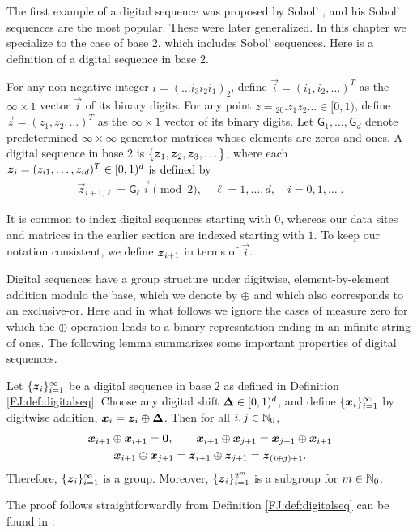 \documentclass[graybox,footinfo]{svmult}
\begin{document}
The first example of a digital sequence was proposed by Sobol' \cite{Sob67}, and his Sobol' sequences are the most popular.  These were later generalized.  In this chapter we specialize to the case of base $2$, which includes Sobol' sequences.  Here is a definition of a digital sequence in base $2$.

\begin{definition} \label{FJ:def:digitalseq}
	For any non-negative integer $i = (\dots i_3 i_2 i_1)_2$, define $\overrightarrow{i} = (i_1, i_2, \dots)^T$ as the $\infty \times 1$ vector $\overrightarrow{i}$ of its binary digits. 
	For any point $z = {}_20.z_1 z_2 \dots \in [0, 1)$, define $\overrightarrow{z} = (z_1, z_2, \dots)^T$ as the $\infty \times 1$ vector of its binary digits. 
	Let $ \mathsf{G}_1, \dots , \mathsf{G}_d$ denote predetermined $\infty \times \infty$ generator matrices whose elements are zeros and ones. 
	A digital sequence in base $2$ is $\{{\boldsymbol{z}}_1, {\boldsymbol{z}}_2, {\boldsymbol{z}}_3, \dots\}$, where each ${\boldsymbol{z}}_i = ( z_{i1}, \dots , z_{id})^T \in [0, 1)^d$ is defined by
	\begin{align*}
	\overrightarrow{z}_{i+1,\ell} = \mathsf{G}_{\ell} \, \overrightarrow{i} \pmod 2,  \quad \ell = 1, \dots, d, \quad i = 0, 1, \dots \;.
	\end{align*}
\end{definition}

It is common to index digital sequences starting with $0$, whereas our data sites and matrices in the earlier section are indexed starting with $1$.  To keep our notation consistent, we define ${\boldsymbol{z}}_{i+1}$ in terms of $\overrightarrow{i}$.

Digital sequences have a group structure under digitwise, element-by-element addition modulo the base, which we denote by $\oplus$ and which also corresponds to an exclusive-or. Here and in what follows we ignore the cases of measure zero for which the $\oplus$ operation leads to a binary represntation ending in an infinite string of ones.  The following lemma summarizes some important properties of digital sequences. 


\begin{lemma}
	\label{FJ:lemma:digital_net_prop}
	Let $\{{\boldsymbol{z}}_i\}_{i=1}^{\infty}$ be a digital sequence in base $2$ as defined in Definition \ref{FJ:def:digitalseq}.  Choose any digital shift ${\boldsymbol{\Delta}} \in [0,1)^d$, and define $\{{\boldsymbol{x}}_i\}_{i=1}^{\infty}$ by digitwise addition, ${\boldsymbol{x}}_{i} = {\boldsymbol{z}}_{i} \oplus {\boldsymbol{\Delta}}$.
	Then for all $i,j \in {\mathbb{N}}_0$,
	\begin{gather}
		\label{FJ:eqn:digital_net_symmetric_prop}
	\bsx_{i+1} \oplus \bsx_{i+1} = \boldsymbol{0}, \qquad 
	\bsx_{i+1} \oplus \bsx_{j+1} = \bsx_{j+1} \oplus \bsx_{i+1} \\
	\label{FJ:eqn:digital_shift_prop}
	\bsx_{i+1} \oplus \bsx_{j+1} = \bsz_{i+1} \oplus \bsz_{j+1} = \bsz_{(i \oplus j) + 1 }.
	\end{gather}
	Therefore, $\{{\boldsymbol{z}}_i\}_{i=1}^{\infty}$ is a group.  Moreover, $\{{\boldsymbol{z}}_i\}_{i=1}^{2^m}$ is a subgroup for $m \in {{\mathbb{N}}}_0$.
\end{lemma}
The proof follows straightforwardly from Definition \ref{FJ:def:digitalseq} can be found in \cite{JagThesis19a}.
\end{document}
